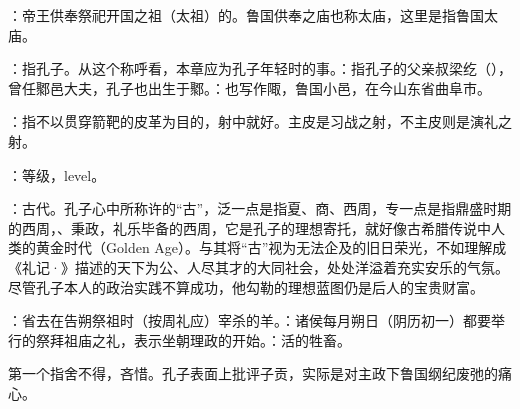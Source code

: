 {
\item {}：帝王供奉祭祀开国之祖（太祖）的。鲁国供奉之庙也称太庙，这里是指鲁国太庙。
\item {}：指孔子。从这个称呼看，本章应为孔子年轻时的事。：指孔子的父亲叔梁纥（），曾任鄹邑大夫，孔子也出生于鄹。：也写作陬，鲁国小邑，在今山东省曲阜市。
}
{}


{
\item {}：指不以贯穿箭靶的皮革为目的，射中就好。主皮是习战之射，不主皮则是演礼之射。

\item {}：等级，level。

\item {}：古代。孔子心中所称许的“古”，泛一点是指夏、商、西周，专一点是指鼎盛时期的西周，、秉政，礼乐毕备的西周，它是孔子的理想寄托，就好像古希腊传说中人类的黄金时代（Golden Age）。与其将“古”视为无法企及的旧日荣光，不如理解成《礼记·》描述的天下为公、人尽其才的大同社会，处处洋溢着充实安乐的气氛。尽管孔子本人的政治实践不算成功，他勾勒的理想蓝图仍是后人的宝贵财富。
}
{}  %


{
\item {}：省去在告朔祭祖时（按周礼应）宰杀的羊。：诸侯每月朔日（阴历初一）都要举行的祭拜祖庙之礼，表示坐朝理政的开始。：活的牲畜。 %
\item {}第一个指舍不得，吝惜。孔子表面上批评子贡，实际是对主政下鲁国纲纪废弛的痛心。
}
{}


